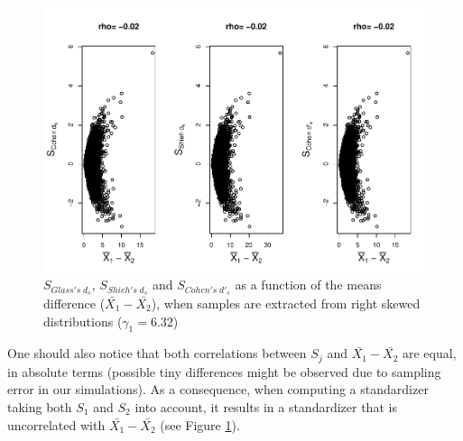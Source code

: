 \documentclass[
  man]{apa6}
\begin{document}
\begin{figure}
\centering
\includegraphics{Correlations-between-the-sample-means-difference-and-standardizers-of-all-estimators,-and-implications-on-biases-and-variances-of-all-estimators_files/figure-latex/pltStdzrHombalRskew-1.pdf}
\caption{\label{fig:pltStdzrHombalRskew}\(S_{Glass's \; d_s}\), \(S_{Shieh's \; d_s}\) and \(S_{Cohen's \; d'_s}\) as a function of the means difference (\(\bar{X_1}-\bar{X_2}\)), when samples are extracted from right skewed distributions (\(\gamma_1 = 6.32\))}
\end{figure}

One should also notice that both correlations between \(S_j\) and \(\bar{X_1}-\bar{X_2}\) are equal, in absolute terms (possible tiny differences might be observed due to sampling error in our simulations). As a consequence, when computing a standardizer taking both \(S_1\) and \(S_2\) into account, it results in a standardizer that is uncorrelated with \(\bar{X_1}-\bar{X_2}\) (see Figure \ref{fig:pltStdzrHombalRskew}).
\end{document}
